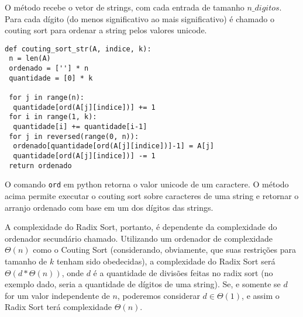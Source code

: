 \documentclass[a4paper, twocolumn]{article}
\theoremstyle{definition}
\begin{document}
O método recebe o vetor de strings, com cada entrada de tamanho $n\_digitos$. Para cada dígito (do menos significativo ao mais significativo) é chamado o couting sort para ordenar a string pelos valores unicode.

\begin{lstlisting}[label=couting_sort_str, caption= Couting Sort para valores unicode de caracteres]
def couting_sort_str(A, indice, k):
 n = len(A)
 ordenado = [''] * n
 quantidade = [0] * k

 for j in range(n): 
  quantidade[ord(A[j][indice])] += 1
 for i in range(1, k): 
  quantidade[i] += quantidade[i-1]
 for j in reversed(range(0, n)):
  ordenado[quantidade[ord(A[j][indice])]-1] = A[j]
  quantidade[ord(A[j][indice])] -= 1
 return ordenado
\end{lstlisting}

O comando \texttt{ord} em python retorna o valor unicode de um caractere. O método acima permite executar o couting sort sobre caracteres de uma string e retornar o arranjo ordenado com base em um dos dígitos das strings.

A complexidade do Radix Sort, portanto, é dependente da complexidade do ordenador secundário chamado. Utilizando um ordenador de complexidade $\Theta(n)$ como o Couting Sort (considerando, obviamente, que suas restrições para tamanho de $k$ tenham sido obedecidas), a complexidade do Radix Sort será $\Theta(d*\Theta(n))$, onde $d$ é a quantidade de divisões feitas no radix sort (no exemplo dado, seria a quantidade de dígitos de uma string). Se, e somente se $d$ for um valor independente de $n$, poderemos considerar $d \in \Theta(1)$, e assim o Radix Sort terá complexidade $\Theta(n)$.
\end{document}
